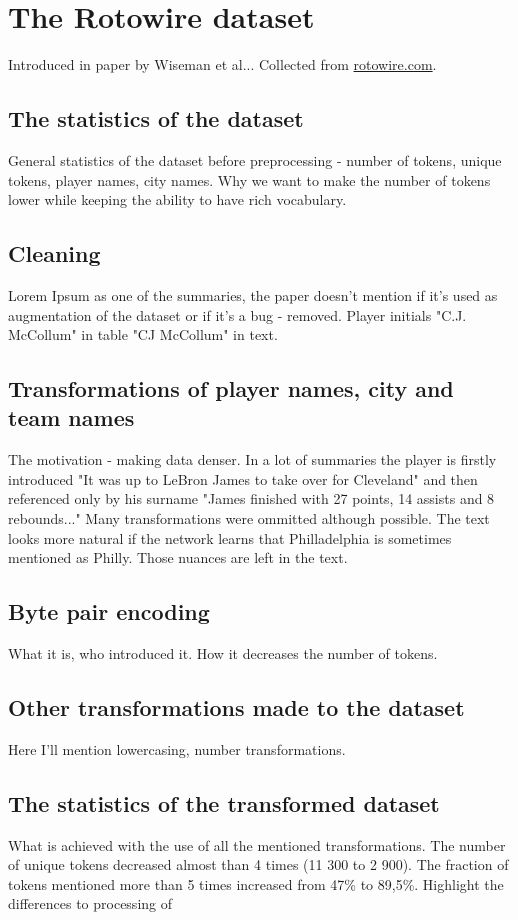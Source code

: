 \chapter{The Rotowire dataset}
Introduced in paper by Wiseman et al... Collected from \href{https://www.rotowire.com/}{rotowire.com}.

\section{The statistics of the dataset}
General statistics of the dataset before preprocessing - number of tokens, unique tokens, player names, city names. Why we want to make the number of tokens lower while keeping the ability to have rich vocabulary.

\section{Cleaning}
Lorem Ipsum as one of the summaries, the paper doesn't mention if it's used as augmentation of the dataset or if it's a bug - removed. Player initials "C.J. McCollum" in table "CJ McCollum" in text. 

\section{Transformations of player names, city and team names}
The motivation - making data denser. In a lot of summaries the player is firstly introduced "It was up to LeBron James to take over for Cleveland" and then referenced only by his surname "James finished with 27 points, 14 assists and 8 rebounds..." Many transformations were ommitted although possible. The text looks more natural if the network learns that Philladelphia is sometimes mentioned as Philly. Those nuances are left in the text.

\section{Byte pair encoding}
What it is, who introduced it. How it decreases the number of tokens.

\section{Other transformations made to the dataset}
Here I'll mention lowercasing, number transformations.

\section{The statistics of the transformed dataset}
What is achieved with the use of all the mentioned transformations. The number of unique tokens decreased almost than 4 times (11 300 to 2 900). The fraction of tokens mentioned more than 5 times increased from 47\% to 89,5\%. Highlight the differences to processing of  
